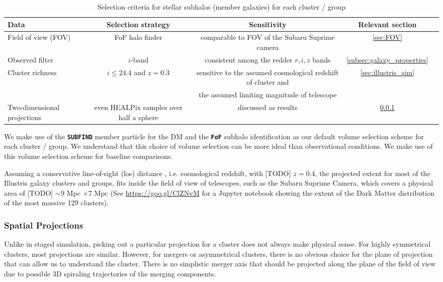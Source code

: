 \begin{table*}
\begin{center}
\begin{minipage}{180mm} 
	\caption{ Selection criteria for stellar subhalos (member galaxies) for each
		cluster / group 
\label{tab:member_galaxy_selections}} 
	\begin{tabular}{@{}lcccc@{}}
\hline 
Data &  Selection strategy  & Sensitivity & Relevant section  \\ \hline
Field of view (FOV) & FoF halo finder& comparable to FOV of the Subaru
Suprime camera & \ref{sec:FOV}  \\ 
Observed filter & $i$-band & consistent among the redder $r, i, z$ bands &   
\ref{subsec:galaxy_properties}
\\ 
Cluster richness  & $i \leq 24.4$ and $z = 0.3$  & sensitive to
the assumed cosmological redshift of cluster and & \ref{sec:illustris_sim} \\ 
& & the assumed limiting magnitude of telescope &   \\
Two-dimensional projections & even HEALPix samples over half a sphere &
discussed as results  & \ref{subsubsec:projections}\\  
\hline
\end{tabular} 
\footnotesize{
}
\end{minipage}
\end{center} 
\end{table*}

We make use of the {\bf \texttt{SUBFIND}} member particle for the DM and the 
{\bf \texttt{FoF}} subhalo identification as our
default volume selection scheme for each cluster / group.
We understand that this choice of volume selection can be more ideal than
observational conditions. We make use of this volume selection scheme
for baseline comparisons. 

Assuming a conservative line-of-sight (los) distance 
, i.e. cosmological redshift, with [TODO] $z = 0.4$, 
the projected extent for most of the Illustris galaxy clusters and groups, 
fits inside the field of view of telescopes, such as the Subaru Suprime Camera,
which covers a physical area of [TODO] $\sim 9$ Mpc $\times 7$ Mpc 
(See \href{https://goo.gl/ClZNvM}{https://goo.gl/ClZNvM} for a Jupyter notebook 
showing the extent of the Dark Matter distribution of the most massive 129
clusters).

\subsubsection{Spatial Projections}
\label{subsubsec:projections}
Unlike in staged simulation, picking out a particular projection for a cluster 
does not always make physical sense.
For highly symmetrical clusters, most projections are similar. 
However, for mergers or asymmetrical clusters, 
there is no obvious choice for the plane of projection that can allow us to
understand the cluster. There is no simplistic merger axis that should be 
projected along the plane of the field of view due to possible 3D spiraling
trajectories of the merging components. 


